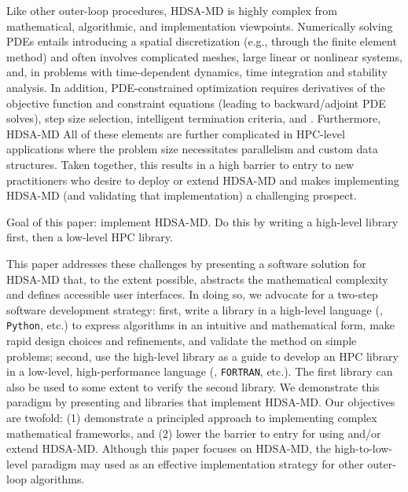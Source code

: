 Like other outer-loop procedures, HDSA-MD is highly complex from mathematical, algorithmic, and implementation viewpoints.
Numerically solving PDEs entails introducing a spatial discretization (e.g., through the finite element method) and often involves complicated meshes, large linear or nonlinear systems, and, in problems with time-dependent dynamics, time integration and stability analysis.
In addition, PDE-constrained optimization requires derivatives of the objective function and constraint equations (leading to backward/adjoint PDE solves), step size selection, intelligent termination criteria, and .
Furthermore, HDSA-MD 
%
All of these elements are further complicated in HPC-level applications where the problem size necessitates parallelism and custom data structures.
Taken together, this results in a high barrier to entry to new practitioners who desire to deploy or extend HDSA-MD and makes implementing HDSA-MD (and validating that implementation) a challenging prospect.

\begin{purpose}
Goal of this paper: implement HDSA-MD. Do this by writing a high-level library first, then a low-level HPC library.
\end{purpose}

This paper addresses these challenges by presenting a software solution for HDSA-MD that, to the extent possible, abstracts the mathematical complexity and defines accessible user interfaces.
In doing so, we advocate for a two-step software development strategy: first, write a library in a high-level language (\MATLAB, \texttt{Python}, etc.) to express algorithms in an intuitive and mathematical form, make rapid design choices and refinements, and validate the method on simple problems; second, use the high-level library as a guide to develop an HPC library in a low-level, high-performance language (\cpp, \texttt{FORTRAN}, etc.).
The first library can also be used to some extent to verify the second library.
We demonstrate this paradigm by presenting \MATLAB and \cpp libraries that implement HDSA-MD.
Our objectives are twofold: (1) demonstrate a principled approach to implementing complex mathematical frameworks, and (2) lower the barrier to entry for using and/or extend HDSA-MD.
Although this paper focuses on HDSA-MD, the high-to-low-level paradigm may used as an effective implementation strategy for other outer-loop algorithms.

